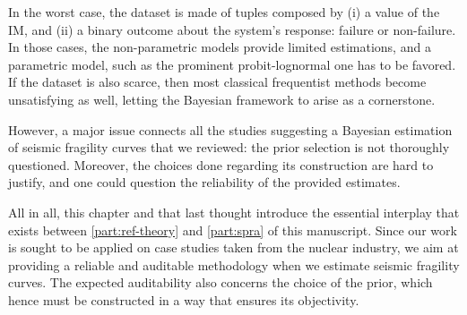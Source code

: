 In the worst case, the dataset is %
made of tuples composed by (i) a value of the IM, and (ii) a binary outcome about the system's response: failure or non-failure.
In those cases, the non-parametric models provide limited estimations, and a parametric model, such as the prominent probit-lognormal one has to be favored.
If the dataset is also scarce, then most classical frequentist methods become unsatisfying as well, letting the Bayesian framework to arise as a cornerstone.

However, 
a major issue connects all the studies 
suggesting a Bayesian estimation of seismic fragility curves that we reviewed: the prior selection is not thoroughly questioned. Moreover, the choices done regarding its construction are hard to justify, and one could question the reliability of the provided estimates.



All in all, this chapter and that last thought introduce the essential interplay that exists between \cref{part:ref-theory} and \cref{part:spra} of this manuscript.
Since our work is sought to be applied on case studies taken from the nuclear industry, we aim at providing a reliable and auditable methodology when we estimate seismic fragility curves.
The expected  auditability also concerns the choice of the prior, which hence must be constructed in a way that ensures its objectivity.





























